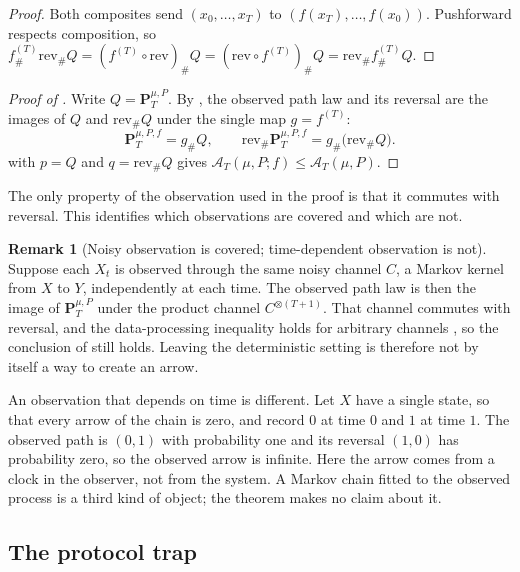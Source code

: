 \documentclass[11pt]{article}
\theoremstyle{definition}
\newtheorem{remark}{Remark}[section]
\newcommand{\rev}{\mathrm{rev}}
\newcommand{\1}{\mathbf{1}}
\newcommand{\thmNGArrowDPI}{\Cref{thm:NG_ARROW_DPI}}
\newcommand{\Arr}{\mathcal{A}}
\begin{document}
\begin{proof}
Both composites send $(x_0,\dots,x_T)$ to $(f(x_T),\dots,f(x_0))$.
Pushforward respects composition, so $f^{(T)}_{\#}\rev_{\#}Q=(f^{(T)}\circ\rev)_{\#}Q=(\rev\circ f^{(T)})_{\#}Q=\rev_{\#}f^{(T)}_{\#}Q$.
\end{proof}

\begin{proof}[Proof of ]
Write $Q=\mathbf{P}^{\mu,P}_T$.
By , the observed path law and its reversal are the images of $Q$ and $\rev_{\#}Q$ under the single map $g=f^{(T)}$:
\[
  \mathbf{P}^{\mu,P,f}_T=g_{\#}Q,\qquad \rev_{\#}\mathbf{P}^{\mu,P,f}_T=g_{\#}\bigl(\rev_{\#}Q\bigr).
\]
 with $p=Q$ and $q=\rev_{\#}Q$ gives $\Arr_T(\mu,P;f)\le\Arr_T(\mu,P)$.
\end{proof}

The only property of the observation used in the proof is that it commutes with reversal.
This identifies which observations are covered and which are not.

\begin{remark}[Noisy observation is covered; time-dependent observation is not]\label{rem:arrow_scope}
Suppose each $X_t$ is observed through the same noisy channel $C$, a Markov kernel from $X$ to $Y$, independently at each time.
The observed path law is then the image of $\mathbf{P}^{\mu,P}_T$ under the product channel $C^{\otimes(T+1)}$.
That channel commutes with reversal, and the data-processing inequality holds for arbitrary channels \citep{CoverThomas2006}, so the conclusion of \thmNGArrowDPI{} still holds.
Leaving the deterministic setting is therefore not by itself a way to create an arrow.

An observation that depends on time is different.
Let $X$ have a single state, so that every arrow of the chain is zero, and record $0$ at time $0$ and $1$ at time $1$.
The observed path is $(0,1)$ with probability one and its reversal $(1,0)$ has probability zero, so the observed arrow is infinite.
Here the arrow comes from a clock in the observer, not from the system.
A Markov chain fitted to the observed process is a third kind of object; the theorem makes no claim about it.
\end{remark}

\subsection{The protocol trap}
\end{document}
